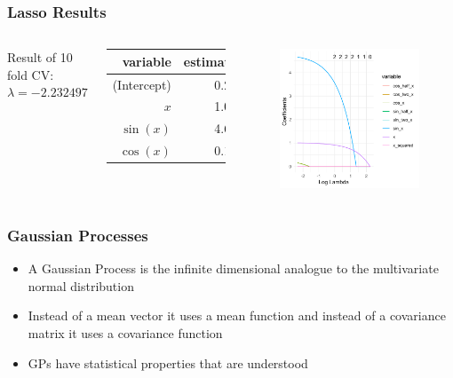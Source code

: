 \documentclass[aspectratio=169]{beamer}
\begin{document}
\begin{frame}
	\frametitle{Lasso Results}
	\begin{columns}
		Result of 10 fold CV: \(\lambda = -2.232497\)
		\begin{table}[ht]
			\centering
			\begin{tabular}{rr}
				\hline
				variable    & estimate \\
				\hline
				(Intercept) & 0.20     \\
				\(x\)       & 1.01     \\
				\(\sin(x)\) & 4.64     \\
				\(\cos(x)\) & 0.13     \\
				\hline
			\end{tabular}
		\end{table}
		\begin{figure}
			\includegraphics[width=\linewidth]{lasso-lambda.pdf}
		\end{figure}
	\end{columns}
\end{frame}

\begin{frame}
	\frametitle{Gaussian Processes}
	\begin{itemize}
		\item A Gaussian Process is the infinite dimensional analogue to the multivariate normal distribution
		\item Instead of a mean vector it uses a mean function and instead of a covariance matrix it uses a covariance function
		\item GPs have statistical properties that are understood
	\end{itemize}
\end{frame}
\end{document}
